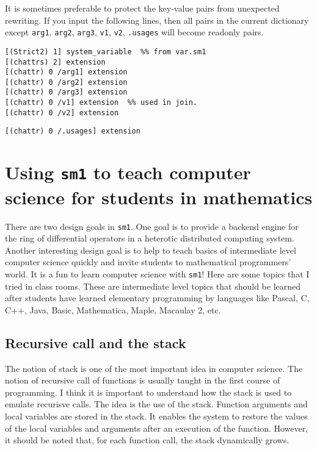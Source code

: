 \documentclass{article}
\begin{document}
It is sometimes preferable to protect the key-value pairs
from unexpected rewriting.
If you input the following lines, then all pairs in the current dictionary
except
{\tt arg1}, {\tt arg2}, {\tt arg3}, {\tt v1}, {\tt v2}, {\tt \at.usages}
will become readonly pairs.
{\footnotesize \begin{verbatim}
[(Strict2) 1] system_variable  %% from var.sm1
[(chattrs) 2] extension
[(chattr) 0 /arg1] extension
[(chattr) 0 /arg2] extension
[(chattr) 0 /arg3] extension
[(chattr) 0 /v1] extension  %% used in join.
[(chattr) 0 /v2] extension
\end{verbatim} 
{\tt [(chattr) 0 /\at.usages] extension}}

\section{Using {\tt sm1} to teach computer science for 
students in mathematics}

There are two design goals in {\tt sm1}.
One  goal  is to provide a backend engine for the ring of differential
operators in a 
heterotic distributed computing system.
Another interesting design goal is to help to teach basics of
intermediate level computer science quickly
and invite students to mathematical programmers' world.
It is a fun to learn computer science with {\tt sm1}!
Here are some topics that I tried in class rooms.
These are intermediate level topics that should be learned after
students have learned elementary programming by languages like
Pascal, C, C++, Java, Basic, Mathematica, Maple,  Macaulay 2, etc.

\subsection{Recursive call and the stack}

The notion of stack is one of the most important idea in computer science.
The notion of recursive call of functions is usually taught in the first
course of programming.
I think it is important to understand how the stack is used to emulate
recurisve calls.
The idea is the use of the stack.
Function arguments and local variables are stored in the stack.
It enables the system to restore the values of the local variables and arguments
after an execution of the function.
However, it should be noted that, for each function call, the stack 
dynamically grows.
\end{document}
